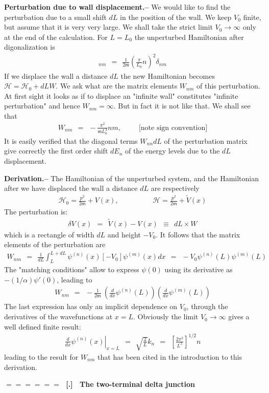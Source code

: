 \documentclass[onecolumn,fleqn]{revtex4}
\newcommand{\mass}{\mathsf{m}}
\newcommand{\beq}{\begin{eqnarray}}
\newcommand{\eeq}{\end{eqnarray}}
\renewcommand{\thesubsection}{\arabic{subsection}}
\renewcommand{\thesubsubsection}{\arabic{subsubsection}}
\newcommand{\sheadC}[1]
{
\addtocounter{subsubsection}{1}
\vspace{5mm}
{\Large\bf $=\!=\!=\!=\!=\!=\;$ [\thesubsection.\thesubsubsection] \ #1}  
\nopagebreak
\phantomsection
}
\begin{document}
{\bf Perturbation due to wall displacement.-- }  
We would like to find the perturbation 
due to a small shift $dL$ in the position of the wall. 
We keep $V_0$ finite, but assume that it is very very large. 
We shall take the strict limit $V_0\rightarrow\infty$ 
only at the end of the calculation.
For $L=L_0$ the unperturbed Hamiltonian 
after digonalization is  
\beq 
[\mathcal{H}_0]_{nm} \ \ = \ \ \frac{1}{2\mass}\left( \frac{\pi}{L_0} n \right)^2 \delta_{nm} 
\eeq
If we displace the wall a distance $dL$ the new Hamiltonian 
becomes ${\mathcal{H}=\mathcal{H}_0 + dL W}$. We ask 
what are the matrix elements $W_{nm}$ of this perturbation. 
At first sight it looks as if to displace an "infinite wall" 
constitutes "infinite perturbation" and hence ${W_{nm}=\infty}$.  
But in fact it is not like that. We shall see that 
\beq 
W_{nm} \ \ = \ \  -\frac{\pi^2}{\mass L_0^3}nm, 
\ \ \ \ \ \ \ \ \ \ \ \mbox{[note sign convention]} 
\eeq
It is easily verified that the diagonal terms $W_{nn}dL$
of the perturbation matrix give correctly the first order 
shift $dE_n$ of the energy levels due to the $dL$ displacement.   

{\bf Derivation.-- }  
The Hamiltonian of the unperturbed system, and the Hamiltonian 
after we have displaced the wall a distance ${dL}$ are respectively 
\beq
\mathcal{H}_0 = \frac{p^2}{2\mass}+V(x), 
\hspace{2cm}
\mathcal{H} = \frac{p^2}{2\mass} + \tilde{V}(x)
\eeq
The perturbation is:
\beq
\delta V(x) \ \ = \ \ \tilde{V}(x) - V(x) \ \ \equiv \ \ dL \times W 
\eeq
which is a rectangle of width ${dL}$ and height ${-V_0}$.
It follows that the matrix elements of the perturbation are   
\beq 
W_{nm} 
\ \ = \ \ 
\frac{1}{dL} \int_{L}^{L+dL} \psi^{(n)}(x) [-V_0] \psi^{(m)}(x) dx 
\ \ = \ \ 
-V_0 \psi^{(n)}(L) \psi^{(m)}(L) 
\eeq
The "matching conditions" allow to express $\psi(0)$ 
using its derivative as $-(1/\alpha)\psi'(0)$, 
leading to  
\beq 
W_{nm} 
\ \  = \ \   
-\frac{1}{2\mass} \ 
\left( \frac{d}{dx} \psi^{(n)} (L) \right) 
\left( \frac{d}{dx} \psi^{(m)} (L) \right) 
\eeq
The last expression has only an implicit dependence 
on $V_0$, through the derivatives of the wavefunctions
at ${x=L}$. Obviously the limit ${V_0 \rightarrow \infty}$ 
gives a well defined finite result:
\beq
\left. \frac{d}{dx} \psi^{(n)}(x) \right|_{x=L} \ \ = \ \ \sqrt{\frac{2}{L}} k_n  \ \ = \ \ \left[\frac{2\pi^2}{L^3}\right]^{1/2}n
\eeq
leading to the result for $W_{nm}$ that has been cited 
in the introduction to this derivation. 


\sheadC{The two-terminal delta junction}
\end{document}
